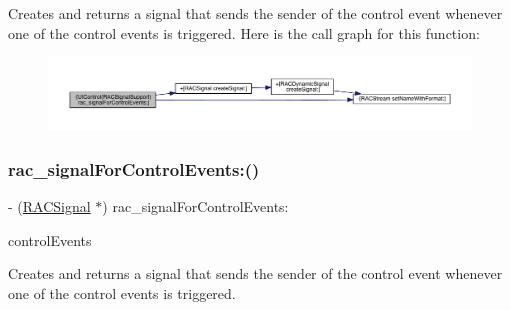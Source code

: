 Creates and returns a signal that sends the sender of the control event whenever one of the control events is triggered. Here is the call graph for this function\+:\nopagebreak
\begin{figure}[H]
\begin{center}
\leavevmode
\includegraphics[width=350pt]{category_u_i_control_07_r_a_c_signal_support_08_ab17517bd2e2c783a3f9c292a62c40e01_cgraph}
\end{center}
\end{figure}
\mbox{\label{category_u_i_control_07_r_a_c_signal_support_08_ab17517bd2e2c783a3f9c292a62c40e01}} 
\subsubsection{\texorpdfstring{rac\+\_\+signal\+For\+Control\+Events\+:()}{rac\_signalForControlEvents:()}\hspace{0.1cm}{\footnotesize\ttfamily [2/3]}}
{\footnotesize\ttfamily -\/ (\mbox{\hyperlink{interface_r_a_c_signal}{R\+A\+C\+Signal}} $\ast$) rac\+\_\+signal\+For\+Control\+Events\+: \begin{DoxyParamCaption}\item[{(U\+I\+Control\+Events)}]{control\+Events }\end{DoxyParamCaption}}

Creates and returns a signal that sends the sender of the control event whenever one of the control events is triggered. \mbox{\label{category_u_i_control_07_r_a_c_signal_support_08_ab17517bd2e2c783a3f9c292a62c40e01}} 
